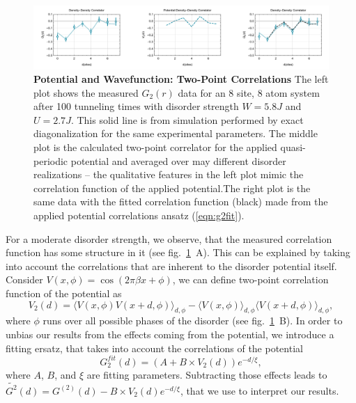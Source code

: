 \begin{figure}[t]
	\centering
	\includegraphics[width=140mm]{figures/MBL_G2Combo_Row.pdf}
	\caption{\label{fig:MBL_g2} \textbf{Potential and Wavefunction: Two-Point Correlations} The left plot shows the measured $G_2(r)$ data for an 8 site, 8 atom system after 100 tunneling times with disorder strength $W=5.8J$ and $U=2.7J$. This solid line is from simulation performed by exact diagonalization for the same experimental parameters. The middle plot is the calculated two-point correlator for the applied quasi-periodic potential and averaged over may different disorder realizations -- the qualitative features in the left plot mimic the correlation function of the applied potential.The right plot is the same data with the fitted correlation function (black) made from the applied potential correlations ansatz (\ref{eqn:g2fit}).}
\end{figure}
For a moderate disorder strength, we observe, that the measured correlation function has some structure in it (see fig.~\ref{fig:MBL_g2}~A). This can be explained by taking into account the correlations that are inherent to the disorder potential itself. Consider $V(x,\phi) = \cos{\left ( 2 \pi \beta x + \phi \right ) }$, we can define two-point correlation function of the potential as
\begin{equation}\label{eqn:v2}
V_{2}(d)= \langle V(x,\phi) V(x+d,\phi) \rangle_{d,\phi} -  \langle V(x,\phi)  \rangle_{d,\phi}  \langle V(x+d,\phi) \rangle_{d,\phi} ,
\end{equation}
where $\phi$ runs over all possible phases of the disorder (see fig.~\ref{fig:MBL_g2}~B). In order to unbias our results from the effects coming from the potential, we introduce a fitting ersatz, that takes into account the correlations of the potential
\begin{equation}\label{eqn:g2fit}
G_{2}^{fit}(d)= (A+B \times  V_2(d)) e^{-d/\xi},
\end{equation}
where $A$, $B$, and $\xi$ are fitting parameters. Subtracting those effects leads to $\widetilde{G^2}(d) = G^{(2)}(d) - B \times  V_2(d) e^{-d/\xi}$, that we use to interpret our results.

